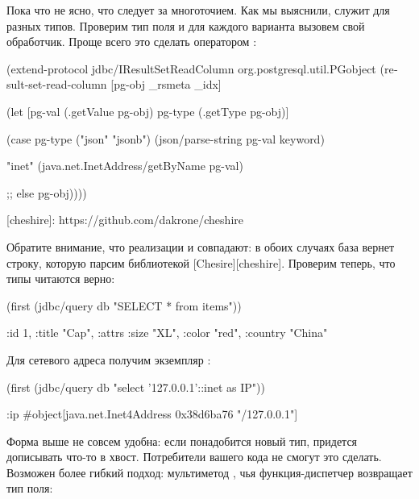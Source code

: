 Пока что не ясно, что следует за многоточием. Как мы выяснили,  служит для разных типов. Проверим тип поля и для каждого варианта вызовем свой обработчик. Проще всего это сделать оператором :

\begin{english}
  \begin{clojure}
(extend-protocol jdbc/IResultSetReadColumn
  org.postgresql.util.PGobject
  (result-set-read-column [pg-obj _rsmeta _idx]

    (let [pg-val (.getValue pg-obj)
          pg-type (.getType pg-obj)]

      (case pg-type
        ("json" "jsonb")
        (json/parse-string pg-val keyword)

        "inet"
        (java.net.InetAddress/getByName pg-val)

        ;; else
        pg-obj))))
  \end{clojure}
\end{english}

[cheshire]: https://github.com/dakrone/cheshire

Обратите внимание, что реализации  и  совпадают: в обоих случаях база вернет строку, которую парсим библиотекой [Chesire][cheshire]. Проверим теперь, что типы читаются верно:

\begin{english}
  \begin{clojure}
(first (jdbc/query db "SELECT * from items"))

{:id 1, :title "Cap", :attrs {:size "XL", :color "red", :country "China"}}
  \end{clojure}
\end{english}

Для сетевого адреса получим экземпляр :

\begin{english}
  \begin{clojure}
(first (jdbc/query db "select '127.0.0.1'::inet as IP"))

{:ip #object[java.net.Inet4Address 0x38d6ba76 "/127.0.0.1"]}
  \end{clojure}
\end{english}

Форма  выше не совсем удобна: если понадобится новый тип, придется дописывать что-то в хвост. Потребители вашего кода не смогут это сделать. Возможен более гибкий подход: мультиметод , чья функция-диспетчер возвращает тип поля:

